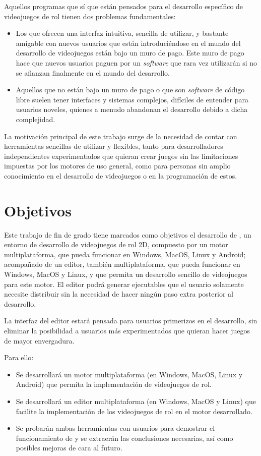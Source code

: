 \smallskip

Aquellos programas que sí que están pensados para el desarrollo específico de videojuegos de rol tienen dos problemas fundamentales:
\begin{itemize}
	\item Los que ofrecen una interfaz intuitiva, sencilla de utilizar, y bastante amigable con nuevos usuarios que están introduciéndose en el mundo del desarrollo de videojuegos están bajo un muro de pago. Este muro de pago hace que nuevos usuarios paguen por un \textit{software} que rara vez utilizarán si no se afianzan finalmente en el mundo del desarrollo.
	\item Aquellos que no están bajo un muro de pago o que son \textit{software} de código libre suelen tener interfaces y sistemas complejos, difíciles de entender para usuarios noveles, quienes a menudo abandonan el desarrollo debido a dicha complejidad.
\end{itemize}

\medskip

La motivación principal de este trabajo surge de la necesidad de contar con herramientas sencillas de utilizar y flexibles, tanto para desarrolladores independientes experimentados que quieran crear juegos sin las limitaciones impuestas por los motores de uso general, como para personas sin amplio conocimiento en el desarrollo de videojuegos o en la programación de estos.

\section{Objetivos}
Este trabajo de fin de grado tiene marcados como objetivos el desarrollo de \baker, un entorno de desarrollo de videojuegos de rol 2D, compuesto por un motor multiplataforma, que pueda funcionar en Windows, MacOS, Linux y Android; acompañado de un editor, también multiplataforma, que pueda funcionar en Windows, MacOS y Linux, y que permita un desarrollo sencillo de videojuegos para este motor. El editor podrá generar ejecutables que el usuario solamente necesite distribuir sin la necesidad de hacer ningún paso extra posterior al desarrollo.

\smallskip

La interfaz del editor estará pensada para usuarios primerizos en el desarrollo, sin eliminar la posibilidad a usuarios más experimentados que quieran hacer juegos de mayor envergadura.

\medskip

Para ello:
\begin{itemize}
	\item Se desarrollará un motor multiplataforma (en Windows, MacOS, Linux y Android) que permita la implementación de videojuegos de rol.
	\item Se desarrollará un editor multiplataforma (en Windows, MacOS y Linux) que facilite la implementación de los videojuegos de rol en el motor desarrollado.
	\item Se probarán ambas herramientas con usuarios para demostrar el funcionamiento de \baker{} y se extraerán las conclusiones necesarias, así como posibles mejoras de cara al futuro.
\end{itemize}

